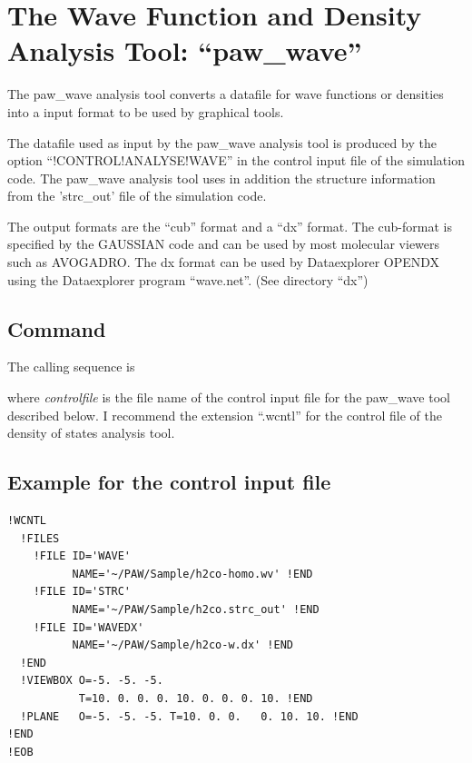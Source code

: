 \documentclass[final,12pt]{article}
\begin{document}
{{{{{{%
\newpage
\section{The Wave Function and Density Analysis Tool: ``paw\_wave''}
The paw\_wave analysis tool converts a datafile for wave functions or
densities into a input format to be used by graphical tools. 

The datafile used as input by the paw\_wave analysis tool is produced
by the option ``!CONTROL!ANALYSE!WAVE'' in the control input file of
the simulation code. The paw\_wave analysis tool uses in addition 
the structure information from  the 'strc\_out' file of the simulation code.

The output formats are the ``cub'' format and a ``dx'' format.  The
cub-format is specified by the GAUSSIAN code and can be used by most
molecular viewers such as AVOGADRO. The dx format can be used by
Dataexplorer OPENDX \cite{opendx} using the Dataexplorer program
``wave.net''. (See directory ``dx'')

\subsection{Command}

The calling sequence is

\bigskip{}\bigskip

\noindent 
where {\it controlfile} is the file name of the control input file for
the paw\_wave tool described below. I recommend the extension
``.wcntl'' for the control file of the density of states analysis tool.

\subsection{Example for the control input file}

\begin{verbatim}
!WCNTL
  !FILES
    !FILE ID='WAVE' 
          NAME='~/PAW/Sample/h2co-homo.wv' !END
    !FILE ID='STRC' 
          NAME='~/PAW/Sample/h2co.strc_out' !END
    !FILE ID='WAVEDX' 
          NAME='~/PAW/Sample/h2co-w.dx' !END
  !END
  !VIEWBOX O=-5. -5. -5. 
           T=10. 0. 0. 0. 10. 0. 0. 0. 10. !END
  !PLANE   O=-5. -5. -5. T=10. 0. 0.   0. 10. 10. !END
!END
!EOB
\end{verbatim}

}}}}}}
\end{document}
